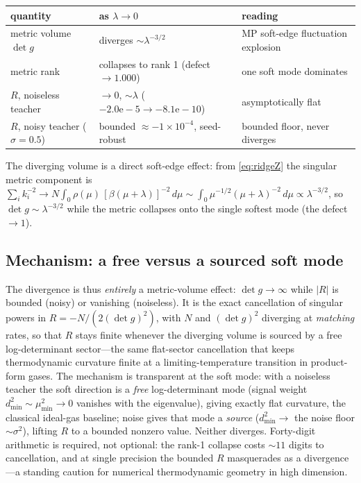 \documentclass[a4paper,11pt]{article}
\theoremstyle{plain}
\theoremstyle{definition}
\theoremstyle{remark}
\newcommand{\Ric}{R}
\newcommand{\detg}{\det g}
\begin{document}
\begin{center}
\begin{tabular}{@{}lll@{}}
\toprule
quantity & as $\lambda\to0$ & reading\\
\midrule
metric volume $\detg$ & diverges $\sim\lambda^{-3/2}$ & MP soft-edge fluctuation explosion\\
metric rank & collapses to rank 1 (defect $\to1.000$) & one soft mode dominates\\
$\Ric$, noiseless teacher & $\to0$, $\sim\lambda$ ($-2.0\mathrm{e}{-}5\to-8.1\mathrm{e}{-}10$) & asymptotically flat\\
$\Ric$, noisy teacher ($\sigma=0.5$) & bounded $\approx-1\times10^{-4}$, seed-robust & bounded floor, never diverges\\
\bottomrule
\end{tabular}
\end{center}

The diverging volume is a direct soft-edge effect: from \eqref{eq:ridgeZ} the singular metric component is
$\sum_i k_i^{-2}\to N\!\int_0\rho(\mu)\,[\beta(\mu+\lambda)]^{-2}\,d\mu\sim\!\int_0
\mu^{-1/2}(\mu+\lambda)^{-2}\,d\mu\propto\lambda^{-3/2}$, so $\detg\sim\lambda^{-3/2}$ while the metric
collapses onto the single softest mode (the defect $\to1$).

\subsection{Mechanism: a free versus a sourced soft mode}\label{sec:ridge-mech}
The divergence is thus \emph{entirely} a metric-volume effect: $\detg\to\infty$ while $|\Ric|$ is bounded
(noisy) or vanishing (noiseless). It is the exact cancellation of singular powers in $\Ric=-N/(2(\detg)^2)$,
with $N$ and $(\detg)^2$ diverging at \emph{matching} rates, so that $\Ric$ stays finite whenever the
diverging volume is sourced by a free log-determinant sector---the same flat-sector cancellation that keeps
thermodynamic curvature finite at a limiting-temperature transition in product-form gases. The mechanism is
transparent at the soft mode: with a noiseless teacher the soft direction is a \emph{free} log-determinant
mode (signal weight $d^2_{\min}\sim\mu^2_{\min}\to0$ vanishes with the eigenvalue), giving exactly flat
curvature, the classical ideal-gas baseline; noise gives that mode a \emph{source} ($d^2_{\min}\to$ the
noise floor $\sim\sigma^2$), lifting $\Ric$ to a bounded nonzero value. Neither diverges. Forty-digit
arithmetic is required, not optional: the rank-1 collapse costs $\sim11$ digits to cancellation, and at
single precision the bounded $\Ric$ masquerades as a divergence---a standing caution for numerical
thermodynamic geometry in high dimension.
\end{document}
